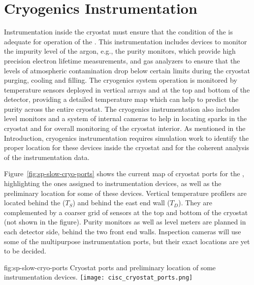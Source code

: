 \section{Cryogenics Instrumentation}
\label{sec:fdsp-cryo-instr} %
\label{sec:fddp-cryo-instr} %
\label{sec:fdgen-cryo-instr} %

Instrumentation inside the cryostat must ensure that the condition of the  is adequate for operation of the .
This instrumentation includes devices to monitor the impurity level of the argon, e.g., the purity monitors, which provide high precision electron lifetime measurements,
and gas analyzers to ensure that the levels of atmospheric contamination drop below certain limits during the cryostat purging, cooling and filling.
The cryogenics system operation is monitored by temperature sensors deployed in vertical arrays and at the top and bottom of the detector, providing a 
detailed \threed temperature map which can help to predict the  purity across the entire cryostat. The cryogenics instrumentation also includes \lar level monitors and
a system of internal cameras to help in locating sparks in the cryostat and for overall monitoring of the cryostat interior. 
As mentioned in the Introduction, cryogenics instrumentation requires simulation work to identify the proper location for these devices inside the cryostat and
for the coherent analysis of the instrumentation data. 

Figure~\ref{fig:sp-slow-cryo-ports} shows the current map of cryostat ports for the , highlighting the ones assigned to instrumentation devices,
as well as the preliminary location for some of these devices. Vertical temperature profilers are located behind the  ($T_S$) and behind the east end wall ($T_D$).
They are complemented by a coarser \twod grid of sensors at the top and bottom of the cryostat (not shown in the figure). Purity monitors as well as level meters are planned
in each detector side, behind the two front end walls. Inspection cameras will use some of the multipurpose instrumentation ports, but their exact locations are yet to be decided. 


\begin{dunefigure}{fig:sp-slow-cryo-ports}
{Cryostat ports and preliminary location of some instrumentation devices. }
\texttt{[image: cisc\_cryostat\_ports.png]}
\end{dunefigure}
